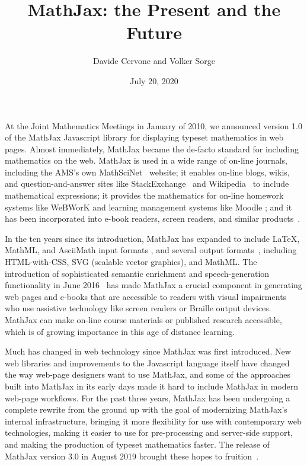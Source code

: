\documentclass{article}
\title{MathJax: the Present and the Future}
\author{Davide Cervone and Volker Sorge}
\date{July 20, 2020}
\begin{document}
\maketitle

\noindent At the Joint Mathematics Meetings in January of 2010, we announced
version 1.0 of the MathJax Javascript library for displaying typeset
mathematics in web pages.  Almost immediately, MathJax became the
de-facto standard for including mathematics on the web.  MathJax is used in
a wide range of on-line journals, including the AMS's own MathSciNet~\cite{MathSciNet}
website; it enables on-line blogs, wikis, and
question-and-answer sites like StackExchange~\cite{StackExchange} and
Wikipedia~\cite{Wikipedia} to include mathematical expressions; it
provides the mathematics for on-line homework systems like WeBWorK
\cite{WeBWorK} and learning management systems like Moodle
\cite{Moodle}; and it has been incorporated into e-book readers,
screen readers, and similar products~\cite{MJ-use}.

In the ten years since its introduction, MathJax has expanded
to include {\LaTeX}, MathML, and AsciiMath input formats
\cite{MJ-input}, and several output formats~\cite{MJ-output}, including HTML-with-CSS,
SVG (scalable vector graphics), and MathML.  The
introduction of sophisticated semantic enrichment and
speech-generation functionality in June 2016~\cite{MJ-accessibility}
has made MathJax a crucial component in generating web pages and
e-books that are accessible to readers with visual impairments who use
assistive technology like screen readers or Braille output devices.
MathJax can make on-line course materials or published research
accessible, which is of growing importance in this age of distance
learning.

Much has changed in web technology since MathJax was first introduced.
New web libraries and improvements to the Javascript language itself
have changed the way web-page designers want to use MathJax, and some
of the approaches built into MathJax in its early days made it hard to
include MathJax in modern web-page workflows.  For the past three years,
MathJax has been undergoing a complete rewrite from the ground up
with the goal of modernizing MathJax's internal infrastructure,
bringing it more flexibility for use with contemporary web
technologies, making it easier to use for pre-processing and
server-side support, and making the production of typeset mathematics
faster.  The release of MathJax version 3.0 in August 2019 brought
these hopes to fruition~\cite{MJ3}.
\end{document}
